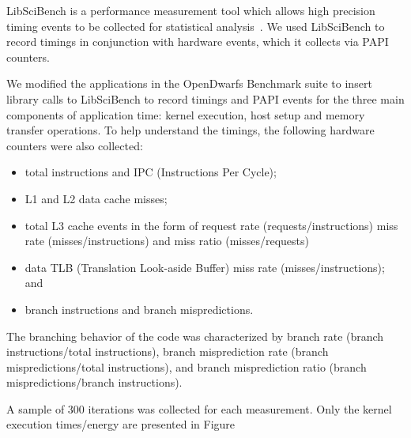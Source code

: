 \documentclass[../document.tex]{subfiles}
\begin{document}
\label{ssec:measurements}

LibSciBench is a performance measurement tool which allows high precision timing events to be collected for statistical analysis~\cite{hoefler2015scientific}.
We used LibSciBench to record timings in conjunction with hardware events, which it collects via PAPI~\cite{mucci1999papi} counters.

We modified the applications in the OpenDwarfs Benchmark suite to insert library calls to LibSciBench to record timings and PAPI events for the three main components of application time: kernel execution, host setup and memory transfer operations. 
To help understand the timings, the following hardware counters were also collected:
\begin{itemize}
	\item total instructions and IPC (Instructions Per Cycle);
	\item L1 and L2 data cache misses;
	\item total L3 cache events in the form of request rate (requests/instructions) miss rate (misses/instructions) and miss ratio (misses/requests)
	\item data TLB (Translation Look-aside Buffer) miss rate (misses/instructions); and
	\item branch instructions and branch mispredictions.
\end{itemize}
The branching behavior of the code was characterized by branch rate (branch instructions/total instructions), branch misprediction rate (branch mispredictions/total instructions), and
branch misprediction ratio (branch mispredictions/branch instructions).

A sample of 300 iterations was collected for each measurement.
Only the kernel execution times/energy are presented in Figure%
\end{document}
